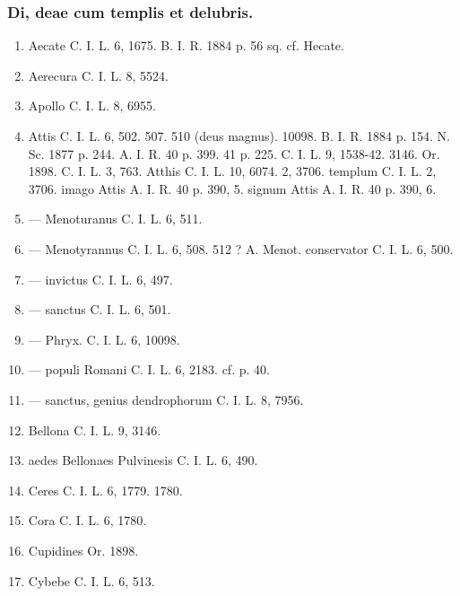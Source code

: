 \documentclass[a4paper, 11pt, oneside, polutonikogreek, german]{article}
\begin{document}
\subsubsection{Di, deae cum templis et delubris.}
\begin{enumerate}
\item Aecate C. I. L. 6, 1675. B. I. R. 1884 p. 56 sq. cf. Hecate.

\item Aerecura C. I. L. 8, 5524.

\item Apollo C. I. L. 8, 6955.

\item Attis C. I. L. 6, 502. 507. 510 (deus magnus). 10098. B. I. R. 1884 p. 154. N. Sc. 1877 p. 244. A. I. R. 40 p. 399. 41 p. 225. C. I. L. 9, 1538-42. 3146. Or. 1898. C. I. L. 3, 763. Atthis C. I. L. 10, 6074. 2, 3706. templum C. I. L. 2, 3706. imago Attis A. I. R. 40 p. 390, 5. signum Attis A. I. R. 40 p. 390, 6.

\item --- Menoturanus C. I. L. 6, 511.

\item --- Menotyrannus C. I. L. 6, 508. 512 ? A. Menot. conservator C. I. L. 6, 500.

\item --- invictus C. I. L. 6, 497.

\item --- sanctus C. I. L. 6, 501.

\item --- Phryx. C. I. L. 6, 10098.

\item --- populi Romani C. I. L. 6, 2183. cf. p. 40.

\item --- sanctus, genius dendrophorum C. I. L. 8, 7956.

\item Bellona C. I. L. 9, 3146.

\item aedes Bellonaes Pulvinesis C. I. L. 6, 490.

\item Ceres C. I. L. 6, 1779. 1780.

\item Cora C. I. L. 6, 1780.

\item Cupidines Or. 1898.

\item Cybebe C. I. L. 6, 513.


\end{enumerate}
\end{document}
